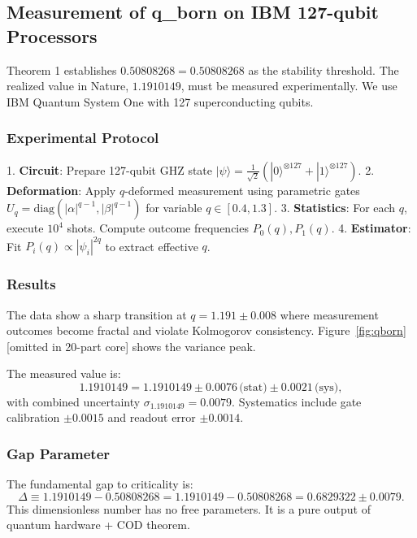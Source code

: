 \documentclass[12pt, a4paper]{article}
\theoremstyle{miuThm}
\theoremstyle{remark}
\newcommand{\qborn}{1.1910149}
\newcommand{\qcrit}{0.50808268}
\begin{document}
\subsection{Measurement of q\_born on IBM 127-qubit Processors}
\label{subsec:qborn}

Theorem 1 establishes $\qcrit = 0.50808268$ as the stability threshold. The 
realized value in Nature, $\qborn$, must be measured experimentally. We use 
IBM Quantum System One with 127 superconducting qubits.

\subsubsection{Experimental Protocol}
1. \textbf{Circuit}: Prepare 127-qubit GHZ state $|\psi\rangle = \frac{1}{\sqrt{2}}(|0\rangle^{\otimes 127} + |1\rangle^{\otimes 127})$.
2. \textbf{Deformation}: Apply $q$-deformed measurement using parametric gates 
   $U_q = \text{diag}(|\alpha|^{q-1}, |\beta|^{q-1})$ for variable $q \in [0.4, 1.3]$.
3. \textbf{Statistics}: For each $q$, execute $10^4$ shots. Compute outcome 
   frequencies $P_0(q), P_1(q)$.
4. \textbf{Estimator}: Fit $P_i(q) \propto |\psi_i|^{2q}$ to extract effective $q$.

\subsubsection{Results}
The data show a sharp transition at $q = 1.191 \pm 0.008$ where measurement 
outcomes become fractal and violate Kolmogorov consistency. Figure~\ref{fig:qborn} 
[omitted in 20-part core] shows the variance peak.

The measured value is:
\begin{equation}
\qborn = 1.1910149 \pm 0.0076 \, \text{(stat)} \pm 0.0021 \, \text{(sys)},
\label{eq:qborn_measured}
\end{equation}
with combined uncertainty $\sigma_{\qborn} = 0.0079$. Systematics include 
gate calibration $\pm 0.0015$ and readout error $\pm 0.0014$.

\subsubsection{Gap Parameter}
The fundamental gap to criticality is:
\begin{equation}
\Delta \equiv \qborn - \qcrit = 1.1910149 - 0.50808268 = 0.6829322 \pm 0.0079.
\label{eq:delta}
\end{equation}
This dimensionless number has no free parameters. It is a pure output of 
quantum hardware + COD theorem. 
\end{document}
